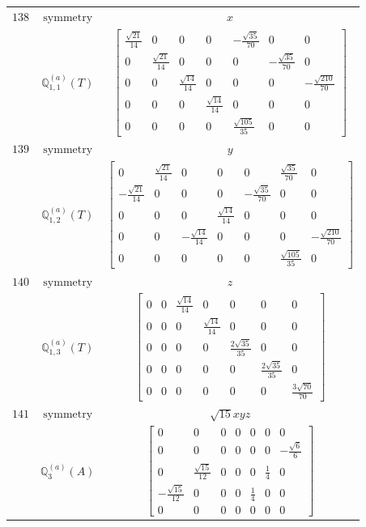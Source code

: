\documentclass[fleqn,8pt,landscape]{jsarticle}
\begin{document}
\begin{longtable}{ccc}
$ 138 $ & $ \text{symmetry} $ & $ x $ \\
$  $ & $ \mathbb{Q}_{1,1}^{(a)}(T) $ & $ \begin{bmatrix} \frac{\sqrt{21}}{14} & 0 & 0 & 0 & - \frac{\sqrt{35}}{70} & 0 & 0 \\ 0 & \frac{\sqrt{21}}{14} & 0 & 0 & 0 & - \frac{\sqrt{35}}{70} & 0 \\ 0 & 0 & \frac{\sqrt{14}}{14} & 0 & 0 & 0 & - \frac{\sqrt{210}}{70} \\ 0 & 0 & 0 & \frac{\sqrt{14}}{14} & 0 & 0 & 0 \\ 0 & 0 & 0 & 0 & \frac{\sqrt{105}}{35} & 0 & 0 \end{bmatrix} $ \\ \hline
$ 139 $ & $ \text{symmetry} $ & $ y $ \\
$  $ & $ \mathbb{Q}_{1,2}^{(a)}(T) $ & $ \begin{bmatrix} 0 & \frac{\sqrt{21}}{14} & 0 & 0 & 0 & \frac{\sqrt{35}}{70} & 0 \\ - \frac{\sqrt{21}}{14} & 0 & 0 & 0 & - \frac{\sqrt{35}}{70} & 0 & 0 \\ 0 & 0 & 0 & \frac{\sqrt{14}}{14} & 0 & 0 & 0 \\ 0 & 0 & - \frac{\sqrt{14}}{14} & 0 & 0 & 0 & - \frac{\sqrt{210}}{70} \\ 0 & 0 & 0 & 0 & 0 & \frac{\sqrt{105}}{35} & 0 \end{bmatrix} $ \\ \hline
$ 140 $ & $ \text{symmetry} $ & $ z $ \\
$  $ & $ \mathbb{Q}_{1,3}^{(a)}(T) $ & $ \begin{bmatrix} 0 & 0 & \frac{\sqrt{14}}{14} & 0 & 0 & 0 & 0 \\ 0 & 0 & 0 & \frac{\sqrt{14}}{14} & 0 & 0 & 0 \\ 0 & 0 & 0 & 0 & \frac{2 \sqrt{35}}{35} & 0 & 0 \\ 0 & 0 & 0 & 0 & 0 & \frac{2 \sqrt{35}}{35} & 0 \\ 0 & 0 & 0 & 0 & 0 & 0 & \frac{3 \sqrt{70}}{70} \end{bmatrix} $ \\ \hline
$ 141 $ & $ \text{symmetry} $ & $ \sqrt{15} x y z $ \\
$  $ & $ \mathbb{Q}_{3}^{(a)}(A) $ & $ \begin{bmatrix} 0 & 0 & 0 & 0 & 0 & 0 & 0 \\ 0 & 0 & 0 & 0 & 0 & 0 & - \frac{\sqrt{6}}{6} \\ 0 & \frac{\sqrt{15}}{12} & 0 & 0 & 0 & \frac{1}{4} & 0 \\ - \frac{\sqrt{15}}{12} & 0 & 0 & 0 & \frac{1}{4} & 0 & 0 \\ 0 & 0 & 0 & 0 & 0 & 0 & 0 \end{bmatrix} $ \\ \hline

\end{longtable}
\end{document}
